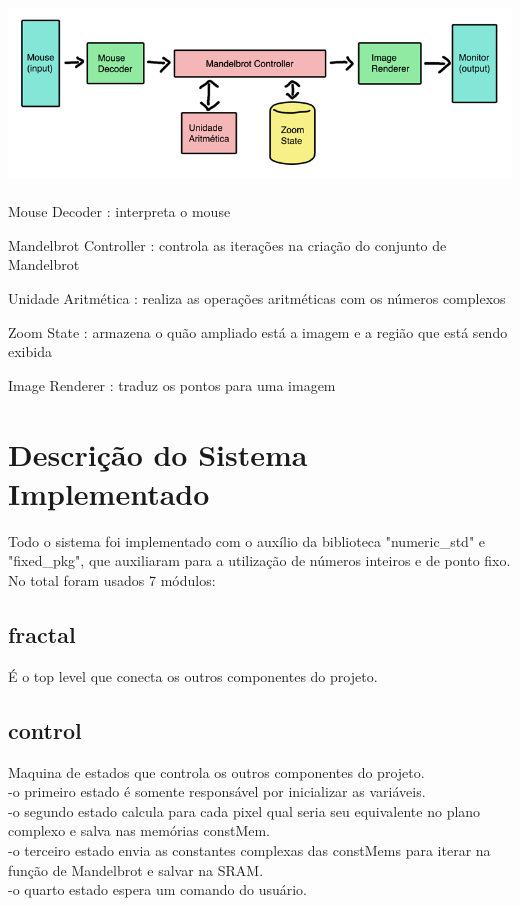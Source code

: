 \documentclass[a4paper, 12pt]{article}
\begin{document}
\includegraphics[width=1\textwidth]{./block_diagram.png}~\\[2cm]

Mouse Decoder : interpreta o mouse

Mandelbrot Controller : controla as iterações na criação do conjunto de Mandelbrot

Unidade Aritmética : realiza as operações aritméticas com os números complexos

Zoom State : armazena o quão ampliado está a imagem e a região que está sendo exibida

Image Renderer : traduz os pontos para uma imagem

\section{Descrição do Sistema Implementado}
Todo o sistema foi implementado com o auxílio da biblioteca "numeric\_std" e "fixed\_pkg", que auxiliaram para a utilização de números inteiros e de ponto fixo. No total foram usados 7 módulos:\\

\subsection{fractal}
É o top level que conecta os outros componentes do projeto.\\
\subsection{control}
Maquina de estados que controla os outros componentes do projeto.\\
-o primeiro estado é somente responsável por inicializar as variáveis.\\
-o segundo estado calcula para cada pixel qual seria seu equivalente no plano complexo e salva nas memórias constMem.\\
-o terceiro estado envia as constantes complexas das constMems para iterar na função de Mandelbrot e salvar na SRAM.\\
-o quarto estado espera um comando do usuário.\\
\end{document}
